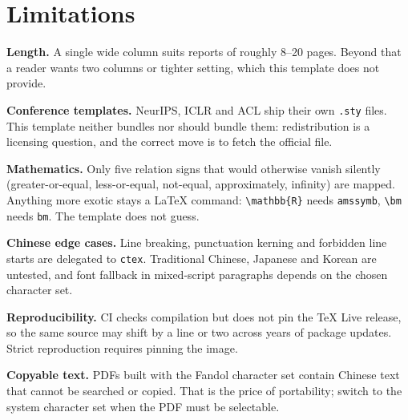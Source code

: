 \section{Limitations}
\label{sec:limit}

\textbf{Length.} A single wide column suits reports of roughly 8--20 pages. Beyond that a
reader wants two columns or tighter setting, which this template does not provide.

\textbf{Conference templates.} NeurIPS, ICLR and ACL ship their own \texttt{.sty} files.
This template neither bundles nor should bundle them: redistribution is a licensing
question, and the correct move is to fetch the official file.

\textbf{Mathematics.} Only five relation signs that would otherwise vanish silently
(greater-or-equal, less-or-equal, not-equal, approximately, infinity) are mapped.
Anything more exotic stays a LaTeX command:
\verb|\mathbb{R}| needs \texttt{amssymb}, \verb|\bm| needs \texttt{bm}. The template does
not guess.

\textbf{Chinese edge cases.} Line breaking, punctuation kerning and forbidden line starts
are delegated to \texttt{ctex}. Traditional Chinese, Japanese and Korean are untested, and
font fallback in mixed-script paragraphs depends on the chosen character set.

\textbf{Reproducibility.} CI checks compilation but does not pin the TeX Live release, so
the same source may shift by a line or two across years of package updates. Strict
reproduction requires pinning the image.

\textbf{Copyable text.} PDFs built with the Fandol character set contain Chinese text that
cannot be searched or copied. That is the price of portability; switch to the system
character set when the PDF must be selectable.
